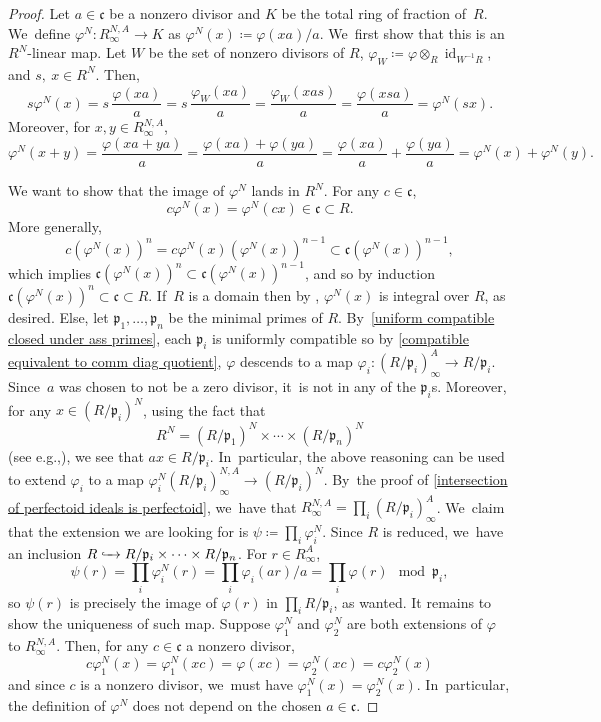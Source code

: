 \documentclass[11pt]{article}
\newcommand{\eg}{e.g.,\xspace}
\let\autoref\cref
\theoremstyle{plain}
\theoremstyle{definition}
\numberwithin{equation}{theorem}
\let\tensor\otimes
\newcommand{\fracc}{\mathfrak{c}}
\newcommand{\p}{\mathfrak{p}}
\DeclareMathOperator{\id}{{id}}
\newcommand{\into}[1][]{\lhook \joinrel \xrightarrow{\ #1\ }}
\renewcommand{\phi}{\varphi}
\newcommand{\inv}{^{-1}}
\newcommand{\rafty}{R^A_\infty}
\newcommand{\ranfty}{R^{N,A}_\infty}
\begin{document}
\begin{proof}
Let $a\in \fracc$ be a nonzero divisor and $K$ be the total ring of fraction of~$R$. We~define $\phi^N\colon \ranfty \to K$ as
$\phi^N
(x)\coloneqq \phi(xa)/a$. We~first show that this is an $R^N$\nobreakdash-linear map. Let $W$ be the set of nonzero divisors of $R$, $\phi_W\coloneqq \phi\tensor_R \id_{W\inv R}$, and $s,\ x\in R^N$. Then,
\[
s \phi^N(x)=s\,\frac{\phi(xa)}{a}=s\,\frac{\phi_W(xa)}{a}=\frac{\phi_W(xas)}{a}=\frac{\phi(xsa)}{a}=\phi^N(sx).
\]
Moreover, for $x,y\in \ranfty$,
\[
\phi^N(x+y)=\frac{\phi(xa+ya)}{a}=\frac{\phi(xa)+\phi(ya)}{a}=\frac{\phi(xa)}{a}+\frac{\phi(ya)}{a}=\phi^N(x)+\phi^N(y).
\]

We want to show that the image of $\phi^N$ lands in $R^N$. For any $c\in \fracc$,
\[c\phi^N(x)=\phi^N(cx)\in \fracc\subset R.\] More generally,
\[
c\left(\phi^N(x)\right)^n=c\phi^N(x)\left(\phi^N(x)\right)^{n-1}\subset \fracc \left(\phi^N(x)\right)^{n-1},
\]
which implies $\fracc\left(\phi^N(x)\right)^n\subset \fracc\left(\phi^N(x)\right)^{n-1}$, and so by induction $\fracc\left(\phi^N(x)\right)^n\subset \fracc\subset R$. If~$R$ is a domain then by \cite[Prop.\,2.4.8]{HunekeSwansonIntegralClosure}, $\phi^N(x)$ is integral over $R$, as desired. Else, let $\p_1,\ldots,\p_n$ be the minimal primes of $R$. By~\autoref{uniform compatible closed under ass primes}, each $\p_i$ is uniformly compatible so by \autoref{compatible equivalent to comm diag quotient}, $\phi$ descends to a map $\phi_i\colon (R/\p_i)^A_\infty\to R/\p_i$.
Since~$a$ was chosen to not be a zero divisor, it~is not in any of the $\p_i$s. Moreover, for any $x\in (R/\p_i)^N$, using the fact that
\[R^N=(R/\p_1)^N\times \cdots \times (R/\p_n)^N\]
(see \eg \cite[Cor.\,2.1.13]{HunekeSwansonIntegralClosure}),
we see that $ax\in R/\p_i$. In~particular, the above reasoning can be used to extend $\phi_i$ to a map $\phi_i^N(R/\p_i)^{N,A}_\infty \to (R/\p_i)^N$. By~the proof of \autoref{intersection of perfectoid ideals is perfectoid}, we~have that $\ranfty=\prod_i (R/\p_i)^A_\infty$. We~claim that the extension we are looking for is $\psi\coloneqq \prod_i \phi^N_i$. Since $R$ is reduced, we~have an inclusion $R\into R/\p_i\times \cdots \times R/\p_n$.
For $r\in \rafty$,
\[
\psi(r)=\prod_i \phi^N_i(r)=\prod_i \phi_i(ar)/a=\prod_i \phi(r) \mod{\p_i},
\]
so $\psi(r)$ is precisely the image of $\phi(r)$ in $\prod_i R/\p_i$, as wanted.
It remains to show the uniqueness of such map. Suppose $\phi^N_1$ and $\phi^N_2$ are both extensions of $\phi$ to $\ranfty$. Then, for any $c\in \fracc$ a nonzero divisor,
\[
c\phi^N_1(x)=\phi^N_1(xc)=\phi(xc)=\phi^N_2(xc)=c\phi^N_2(x)
\]
and since $c$ is a nonzero divisor, we~must have $\phi^N_1(x)=\phi^N_2(x)$. In~particular, the definition of $\phi^N$ does not depend on the chosen $a\in \fracc$.
\end{proof}
\end{document}
